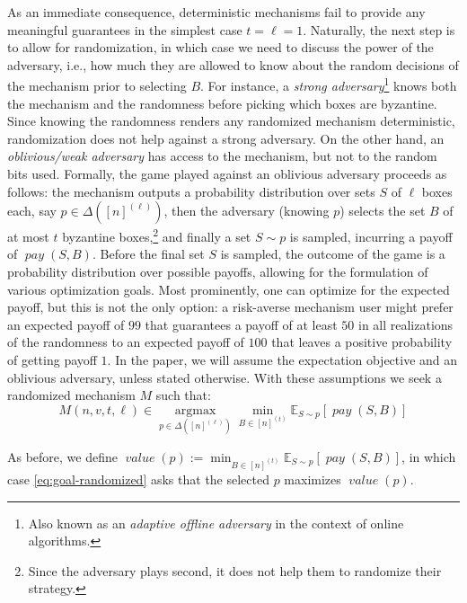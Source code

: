 \documentclass[sigconf,nonacm]{aamas}
\DeclareMathOperator{\payText}{\textit{pay}}
\newcommand{\pay}[1]{\payText({#1})}
\DeclareMathOperator{\valueText}{\textit{value}}
\newcommand{\val}[1]{\valueText({#1})}
\begin{document}
As an immediate consequence, deterministic mechanisms fail to provide any meaningful guarantees in the simplest case $t = \ell = 1$.  Naturally, the next step is to allow for randomization, in which case we need to discuss the power of the adversary, i.e., how much they are allowed to know about the random decisions of the mechanism prior to selecting $B$. 
For instance, a \emph{strong adversary}\footnote{Also known as an \emph{adaptive offline adversary} in the context of online algorithms.} knows both the mechanism and the randomness before picking which boxes are byzantine.
Since knowing the randomness renders any randomized mechanism deterministic, randomization does not help against a strong adversary. On the other hand, an \emph{oblivious/weak adversary} has access to the mechanism, but not to the random bits used. Formally, the game played against an oblivious adversary proceeds as follows: the mechanism outputs a probability distribution over sets $S$ of $\ell$ boxes each, say $p \in \Delta\left([n]^{(\ell)}\right)$, then the adversary (knowing $p$) selects the set $B$ of at most $t$ byzantine boxes,\footnote{Since the adversary plays second, it does not help them to randomize their strategy.} and finally a set $S \sim p$ is sampled, incurring a payoff of $\pay{S, B}.$ Before the final set $S$ is sampled, the outcome of the game is a probability distribution over possible payoffs, allowing for the formulation of various optimization goals. Most prominently, one can optimize for the expected payoff, but this is not the only option: a risk-averse mechanism user might prefer an expected payoff of $99$ that guarantees a payoff of at least $50$ in all realizations of the randomness to an expected payoff of $100$ that leaves a positive probability of getting payoff $1$.
In the paper, we will assume the expectation objective and an oblivious adversary, unless stated otherwise. With these assumptions
we seek a randomized mechanism $M$ such that:%
%
\begin{equation}\label{eq:goal-randomized}
    M(n, v, t, \ell) \in \operatorname*{argmax}_{p \in \Delta\left([n]^{(\ell)}\right)} \min_{B \in [n]^{(t)}}\mathbb{E}_{S \sim p}[\pay{S, B}]
\end{equation}

As before, we define $\val{p} := \min_{B \in [n]^{(t)}}\mathbb{E}_{S \sim p}[\pay{S, B}]$, in which case \cref{eq:goal-randomized} asks that the selected $p$ maximizes $\val{p}$.
\end{document}
